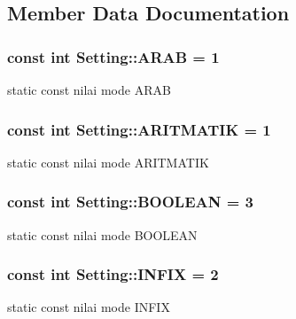 \subsection{Member Data Documentation}
\hypertarget{class_setting_a11455d898348b01ebe6d156e157af5b1}{}
\subsubsection[{A\+R\+A\+B}]{\setlength{\rightskip}{0pt plus 5cm}const int Setting\+::\+A\+R\+A\+B = 1\hspace{0.3cm}{\ttfamily [static]}}\label{class_setting_a11455d898348b01ebe6d156e157af5b1}
static const nilai mode A\+R\+A\+B \hypertarget{class_setting_afcddeacd578cc69a5f5b790cfa5c187e}{}
\subsubsection[{A\+R\+I\+T\+M\+A\+T\+I\+K}]{\setlength{\rightskip}{0pt plus 5cm}const int Setting\+::\+A\+R\+I\+T\+M\+A\+T\+I\+K = 1\hspace{0.3cm}{\ttfamily [static]}}\label{class_setting_afcddeacd578cc69a5f5b790cfa5c187e}
static const nilai mode A\+R\+I\+T\+M\+A\+T\+I\+K \hypertarget{class_setting_a268ad37e785a08a88b2fc05fdf9a3033}{}
\subsubsection[{B\+O\+O\+L\+E\+A\+N}]{\setlength{\rightskip}{0pt plus 5cm}const int Setting\+::\+B\+O\+O\+L\+E\+A\+N = 3\hspace{0.3cm}{\ttfamily [static]}}\label{class_setting_a268ad37e785a08a88b2fc05fdf9a3033}
static const nilai mode B\+O\+O\+L\+E\+A\+N \hypertarget{class_setting_afb7ad1019382068120bcc6b0726e4cf7}{}
\subsubsection[{I\+N\+F\+I\+X}]{\setlength{\rightskip}{0pt plus 5cm}const int Setting\+::\+I\+N\+F\+I\+X = 2\hspace{0.3cm}{\ttfamily [static]}}\label{class_setting_afb7ad1019382068120bcc6b0726e4cf7}
static const nilai mode I\+N\+F\+I\+X \hypertarget{class_setting_aa034225cee86523b7d4ebd13f329150f}{}
